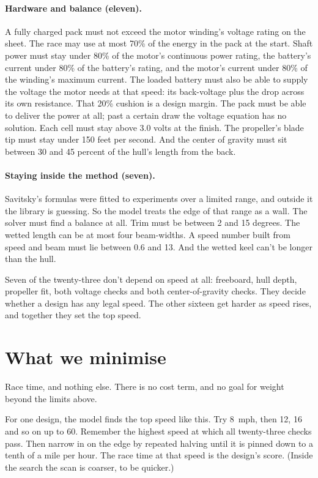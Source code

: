 \documentclass[11pt,a4paper]{article}
\renewcommand{\_}{\textunderscore\allowbreak}
\begin{document}
\paragraph{Hardware and balance (eleven).} A fully charged pack must not exceed the motor winding's voltage rating on the sheet. The race may use at most 70\% of the energy in the pack at the start. Shaft power must stay under 80\% of the motor's continuous power rating, the battery's current under 80\% of the battery's rating, and the motor's current under 80\% of the winding's maximum current. The loaded battery must also be able to supply the voltage the motor needs at that speed: its back-voltage plus the drop across its own resistance. That 20\% cushion is a design margin. The pack must be able to deliver the power at all; past a certain draw the voltage equation has no solution.
Each cell must stay above 3.0 volts at the finish. The propeller's blade tip must stay under 150 feet per second. And the center of gravity must sit between 30 and 45 percent of the hull's length from the back.

\paragraph{Staying inside the method (seven).} Savitsky's formulas were fitted to experiments over a limited range, and outside it the library is guessing. So the model treats the edge of that range as a wall.
The solver must find a balance at all. Trim must be between 2 and 15 degrees. The wetted length can be at most four beam-widths. A speed number built from speed and beam must lie between 0.6 and 13.
And the wetted keel can't be longer than the hull.

Seven of the twenty-three don't depend on speed at all: freeboard, hull depth, propeller fit, both voltage checks and both center-of-gravity checks. They decide whether a design has any legal speed.
The other sixteen get harder as speed rises, and together they set the top speed.

\section*{What we minimise}
\label{sec:objective}

Race time, and nothing else. There is no cost term, and no goal for weight beyond the limits above.

For one design, the model finds the top speed like this. Try 8~mph, then 12, 16 and so on up to 60. Remember the highest speed at which all twenty-three checks pass. Then narrow in on the edge by repeated halving
until it is pinned down to a tenth of a mile per hour. The race time at that speed is the design's score. (Inside the search the scan is coarser, to be quicker.)
\end{document}
